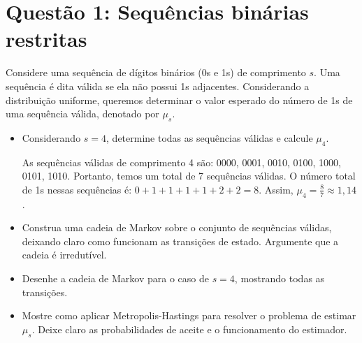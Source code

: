 \section*{Questão 1: Sequências binárias restritas}

Considere uma sequência de dígitos binários (0s e 1s) de comprimento $s$. Uma sequência é dita válida se ela não possui 1s adjacentes. Considerando a distribuição uniforme, queremos determinar o valor esperado do número de 1s de uma sequência válida, denotado por $\mu_s$.

\begin{itemize}
  \item Considerando $s = 4$, determine todas as sequências válidas e calcule $\mu_4$.
  \begin{resposta}
    As sequências válidas de comprimento 4 são: 0000, 0001, 0010, 0100, 1000, 0101, 1010. Portanto, temos um total de 7 sequências válidas. O número total de 1s nessas sequências é: $0 + 1 + 1 + 1 + 1 + 2 + 2 = 8$. Assim, $\mu_4 = \frac{8}{7} \approx 1{,}14$.
  \end{resposta}
  \item Construa uma cadeia de Markov sobre o conjunto de sequências válidas, deixando claro como funcionam as transições de estado. Argumente que a cadeia é irredutível.
  \begin{resposta}
  \end{resposta}
  \item Desenhe a cadeia de Markov para o caso de $s = 4$, mostrando todas as transições.
  \begin{resposta}
  \end{resposta}
  \item Mostre como aplicar Metropolis-Hastings para resolver o problema de estimar $\mu_s$. Deixe claro as probabilidades de aceite e o funcionamento do estimador.
  \begin{resposta}
  \end{resposta}
\end{itemize}